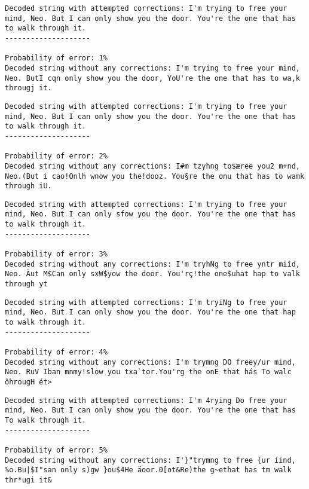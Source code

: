 \documentclass[
  letterpaper,
  DIV=11,
  numbers=noendperiod]{scrartcl}
\begin{document}
\begin{lstlisting}
Decoded string with attempted corrections: I'm trying to free your mind, Neo. But I can only show you the door. You're the one that has to walk through it.
--------------------

Probability of error: 1%
Decoded string without any corrections: I'm trying to free your mind, Neo. ButI cqn only show you the door, YoU're the one that has to wa,k througj it.
\end{lstlisting}

\begin{lstlisting}
Decoded string with attempted corrections: I'm trying to free your mind, Neo. But I can only show you the door. You're the one that has to walk through it.
--------------------

Probability of error: 2%
Decoded string without any corrections: I#m tzyhng to$æree you2 m+nd, Neo.(But i cao!Onlh wnow you the!dooz. You§re the onu that has to wamk through iU.
\end{lstlisting}

\begin{lstlisting}
Decoded string with attempted corrections: I'm trying to free your mind, Neo. But I can only sfow you the door. You're the one that has to walk through it.
--------------------

Probability of error: 3%
Decoded string without any corrections: I'm tryhNg to free yntr miîd, Neo. Âut M$Can only sxW$yow the door. You'rç!the one$uhat hap to valk through yt
\end{lstlisting}

\begin{lstlisting}
Decoded string with attempted corrections: I'm tryiNg to free your mind, Neo. But I can only show you the door. You're the one that hap to walk through it.
--------------------

Probability of error: 4%
Decoded string without any corrections: I'm trymng DO freey/ur mind, Neo. RuV Iban mnmy!slow you txa`tor.You'rg the onE that hás To walc ôhrougH ét>
\end{lstlisting}

\begin{lstlisting}
Decoded string with attempted corrections: I'm 4rying Do free your mind, Neo. But I can only show you the door. You're the one that has To walk through it.
--------------------

Probability of error: 5%
Decoded string without any corrections: I'}"trymng to free {ur íind, %o.Bu|$I"san only s)gw }ou$4He äoor.0[ot&Re)the g~ethat has tm walk thr*ugi it&
\end{lstlisting}
\end{document}
